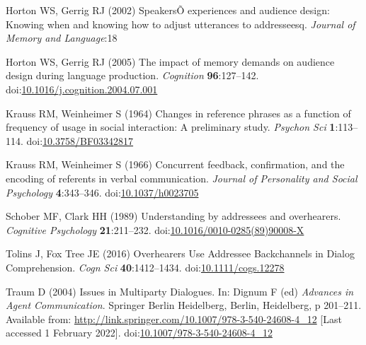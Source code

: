 \documentclass[
  english,
  a4paper,
]{article}
\newlength{\cslhangindent}
\newlength{\cslentryspacingunit} %
\newenvironment{CSLReferences}[2] %
 {%
  \setlength{\parindent}{0pt}
  \ifodd #1
  \let\oldpar\par
  \def\par{\hangindent=\cslhangindent\oldpar}
  \fi
  \setlength{\parskip}{#2\cslentryspacingunit}
 }%
 {}
\begin{document}
\begin{CSLReferences}{1}{0}
\leavevmode{}%
Horton WS, Gerrig RJ (2002) {SpeakersÕ} experiences and audience design: Knowing when and knowing how to adjust utterances to addresseesq. \emph{Journal of Memory and Language}:18

\leavevmode{}%
Horton WS, Gerrig RJ (2005) The impact of memory demands on audience design during language production. \emph{Cognition} \textbf{96}:127--142. doi:\href{https://doi.org/10.1016/j.cognition.2004.07.001}{10.1016/j.cognition.2004.07.001}

\leavevmode{}%
Krauss RM, Weinheimer S (1964) Changes in reference phrases as a function of frequency of usage in social interaction: A preliminary study. \emph{Psychon Sci} \textbf{1}:113--114. doi:\href{https://doi.org/10.3758/BF03342817}{10.3758/BF03342817}

\leavevmode{}%
Krauss RM, Weinheimer S (1966) Concurrent feedback, confirmation, and the encoding of referents in verbal communication. \emph{Journal of Personality and Social Psychology} \textbf{4}:343--346. doi:\href{https://doi.org/10.1037/h0023705}{10.1037/h0023705}

\leavevmode{}%
Schober MF, Clark HH (1989) Understanding by addressees and overhearers. \emph{Cognitive Psychology} \textbf{21}:211--232. doi:\href{https://doi.org/10.1016/0010-0285(89)90008-X}{10.1016/0010-0285(89)90008-X}

\leavevmode{}%
Tolins J, Fox Tree JE (2016) Overhearers {Use Addressee Backchannels} in {Dialog Comprehension}. \emph{Cogn Sci} \textbf{40}:1412--1434. doi:\href{https://doi.org/10.1111/cogs.12278}{10.1111/cogs.12278}

\leavevmode{}%
Traum D (2004) Issues in {Multiparty Dialogues}. In: Dignum F (ed) \emph{Advances in {Agent Communication}}. {Springer Berlin Heidelberg}, {Berlin, Heidelberg}, p 201--211. Available from: \url{http://link.springer.com/10.1007/978-3-540-24608-4_12} {[}Last accessed 1 February 2022{]}. doi:\href{https://doi.org/10.1007/978-3-540-24608-4_12}{10.1007/978-3-540-24608-4\_12}

\end{CSLReferences}
\end{document}
